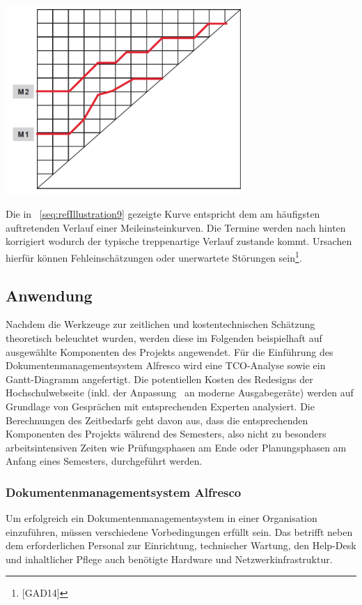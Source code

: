 \documentclass[a4paper]{article}
\makeatletter
\newcommand\captionof[1]{\def\@captype{#1}\caption}
\makeatother
\begin{document}
{\centering \includegraphics[width=9.091cm,height=7.158cm]{INMAusarbeitung02-img010.png}
\captionof{figure}[Kurvenverlauf der Optimistenschätzung]{Kurvenverlauf der Optimistenschätzung}
\label{seq:refIllustration9}
\par}
{\sffamily
Die in \figurename~\ref{seq:refIllustration9} gezeigte Kurve entspricht dem am häufigsten auftretenden Verlauf einer
Meileinsteinkurven. Die Termine werden nach hinten korrigiert wodurch der typische treppenartige Verlauf zustande
kommt. Ursachen hierfür können Fehleinschätzungen oder unerwartete Störungen sein\footnote{[GAD14]}.}

\subsection[Anwendung]{Anwendung}
{\sffamily
Nachdem die Werkzeuge zur zeitlichen und kostentechnischen Schätzung theoretisch beleuchtet wurden, werden diese im
Folgenden beispielhaft auf ausgewählte Komponenten des Projekts angewendet. Für die Einführung des
Dokumentenmanagementsystem Alfresco wird eine TCO-Analyse sowie ein Gantt-Diagramm angefertigt. Die potentiellen Kosten
des Redesigns der Hochschulwebseite (inkl. der Anpassung \ an moderne Ausgabegeräte) werden auf Grundlage von
Gesprächen mit entsprechenden Experten analysiert. Die Berechnungen des Zeitbedarfs geht davon aus, dass die
entsprechenden Komponenten des Projekts während des Semesters, also nicht zu besonders arbeitsintensiven Zeiten wie
Prüfungsphasen am Ende oder Planungsphasen am Anfang eines Semesters, durchgeführt werden.}

\subsubsection[Dokumentenmanagementsystem Alfresco]{\color{black} Dokumentenmanagementsystem Alfresco}
\label{bkm:RefHeading24767162299686}{\sffamily
Um erfolgreich ein Dokumentenmanagementsystem in einer Organisation einzuführen, müssen verschiedene Vorbedingungen
erfüllt sein. Das betrifft neben dem erforderlichen Personal zur Einrichtung, technischer Wartung, den Help-Desk und
inhaltlicher Pflege auch benötigte Hardware und Netzwerkinfrastruktur.}
\end{document}
